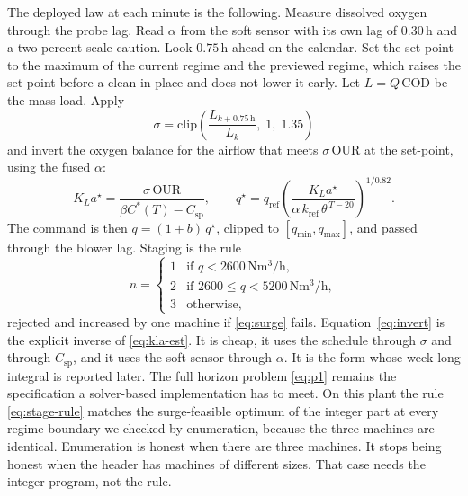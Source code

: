The deployed law at each minute is the following. Measure dissolved oxygen through the probe lag. Read $\alpha$ from the soft sensor with its own lag of $0.30\,\mathrm{h}$ and a two-percent scale caution. Look $0.75\,\mathrm{h}$ ahead on the calendar. Set the set-point to the maximum of the current regime and the previewed regime, which raises the set-point before a clean-in-place and does not lower it early. Let $L=Q\,\mathrm{COD}$ be the mass load. Apply
\begin{equation}
\label{eq:scale}
\sigma
=
\mathrm{clip}\!\left(
\frac{L_{k+0.75\,\mathrm{h}}}{L_{k}},\;
1,\;
1.35
\right)
\end{equation}
and invert the oxygen balance for the airflow that meets $\sigma\,\mathrm{OUR}$ at the set-point, using the fused $\alpha$:
\begin{equation}
\label{eq:invert}
K_La^{\star}
=
\frac{\sigma\,\mathrm{OUR}}{\beta C^{*}(T)-C_{\mathrm{sp}}},
\qquad
q^{\star}
=
q_{\mathrm{ref}}
\left(
\frac{K_La^{\star}}{\alpha\,k_{\mathrm{ref}}\,\theta^{\,T-20}}
\right)^{1/0.82}.
\end{equation}
The command is then $q=(1+b)\,q^{\star}$, clipped to $[q_{\min},q_{\max}]$, and passed through the blower lag. Staging is the rule
\begin{equation}
\label{eq:stage-rule}
n
=
\begin{cases}
1 & \text{if } q < 2600\,\mathrm{Nm^{3}/h},\\
2 & \text{if } 2600 \le q < 5200\,\mathrm{Nm^{3}/h},\\
3 & \text{otherwise},
\end{cases}
\end{equation}
rejected and increased by one machine if \eqref{eq:surge} fails. Equation~\eqref{eq:invert} is the explicit inverse of \eqref{eq:kla-est}. It is cheap, it uses the schedule through $\sigma$ and through $C_{\mathrm{sp}}$, and it uses the soft sensor through $\alpha$. It is the form whose week-long integral is reported later. The full horizon problem \eqref{eq:p1} remains the specification a solver-based implementation has to meet. On this plant the rule \eqref{eq:stage-rule} matches the surge-feasible optimum of the integer part at every regime boundary we checked by enumeration, because the three machines are identical. Enumeration is honest when there are three machines. It stops being honest when the header has machines of different sizes. That case needs the integer program, not the rule.


